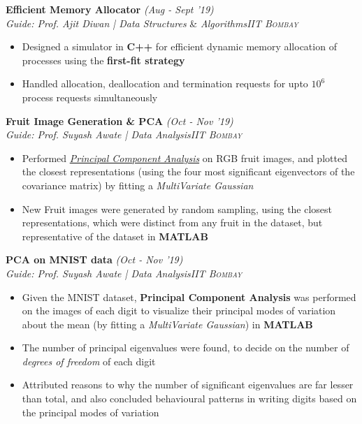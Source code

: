 \documentclass{article}
\begin{document}
\vspace{-5pt}
\textbf{Efficient Memory Allocator} \hfill{\sl \small (Aug - Sept '19)}\\{\it Guide: Prof. Ajit Diwan | Data Structures} \& {\it Algorithms}\hfill{\sl \small \textsc{IIT Bombay}}\\
\vspace{-19pt}
\begin{itemize}[itemsep = -1 mm, leftmargin=*]
  \item Designed a simulator in \textbf{C++} for efficient dynamic memory allocation of processes using the \textbf{first-fit strategy}
   \item Handled allocation, deallocation and termination requests for upto $10^{\text{6}}$ process requests simultaneously
\end{itemize}
\vspace{-5pt}
\textbf{Fruit Image Generation \& PCA} \hfill{\sl \small (Oct - Nov '19)}\\{\it Guide: Prof. Suyash Awate | Data Analysis}\hfill{\sl \small \textsc{IIT Bombay}}\\
\vspace{-19pt}
\begin{itemize}[itemsep = -1 mm, leftmargin=*]
   \item Performed \textit{\underline{Principal Component Analysis}} on RGB fruit images, and plotted the closest representations (using the four most significant eigenvectors of the covariance matrix) by fitting a \textit{MultiVariate Gaussian}
    \item New Fruit images were generated by random sampling, using the closest representations, which were distinct from any fruit in the dataset, but representative of the dataset in \textbf{MATLAB}
\end{itemize}
\vspace{-5pt}
\textbf{PCA on MNIST data} \hfill{\sl \small (Oct - Nov '19)}\\{\it Guide: Prof. Suyash Awate | Data Analysis}\hfill{\sl \small \textsc{IIT Bombay}}\\
\vspace{-19pt}
\begin{itemize}[itemsep = -1 mm, leftmargin=*]
   \item Given the MNIST dataset, \textbf{Principal Component Analysis} was performed on the images of each digit to visualize their principal modes of variation about the mean (by fitting a \textit {MultiVariate Gaussian}) in \textbf{MATLAB}
    \item The number of principal eigenvalues were found, to decide on the number of \textit{degrees of freedom} of each digit
    \item Attributed reasons to why the number of significant eigenvalues are far lesser than total, and also concluded behavioural patterns in writing digits based on the principal modes of variation
\end{itemize}
\end{document}
